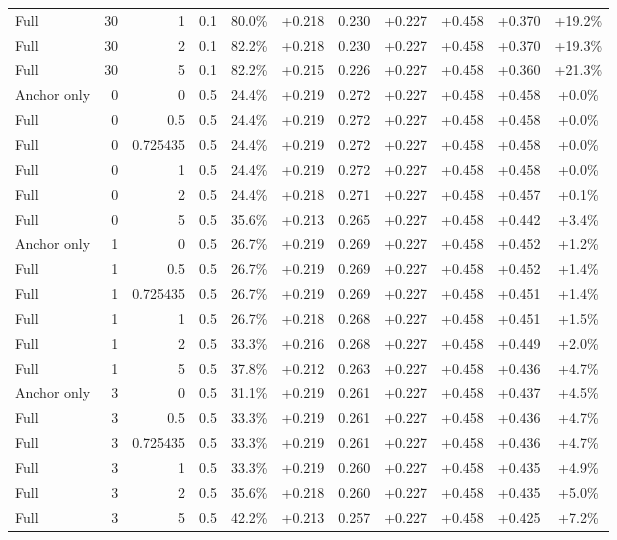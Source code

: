 \begin{table}[htbp]
\begin{tabular}{lrrrccccccc}
Full & 30 & 1 & 0.1 & 80.0\% & +0.218 & 0.230 & +0.227 & +0.458 & +0.370 & +19.2\% \\
Full & 30 & 2 & 0.1 & 82.2\% & +0.218 & 0.230 & +0.227 & +0.458 & +0.370 & +19.3\% \\
Full & 30 & 5 & 0.1 & 82.2\% & +0.215 & 0.226 & +0.227 & +0.458 & +0.360 & +21.3\% \\
Anchor only & 0 & 0 & 0.5 & 24.4\% & +0.219 & 0.272 & +0.227 & +0.458 & +0.458 & +0.0\% \\
Full & 0 & 0.5 & 0.5 & 24.4\% & +0.219 & 0.272 & +0.227 & +0.458 & +0.458 & +0.0\% \\
Full & 0 & 0.725435 & 0.5 & 24.4\% & +0.219 & 0.272 & +0.227 & +0.458 & +0.458 & +0.0\% \\
Full & 0 & 1 & 0.5 & 24.4\% & +0.219 & 0.272 & +0.227 & +0.458 & +0.458 & +0.0\% \\
Full & 0 & 2 & 0.5 & 24.4\% & +0.218 & 0.271 & +0.227 & +0.458 & +0.457 & +0.1\% \\
Full & 0 & 5 & 0.5 & 35.6\% & +0.213 & 0.265 & +0.227 & +0.458 & +0.442 & +3.4\% \\
Anchor only & 1 & 0 & 0.5 & 26.7\% & +0.219 & 0.269 & +0.227 & +0.458 & +0.452 & +1.2\% \\
Full & 1 & 0.5 & 0.5 & 26.7\% & +0.219 & 0.269 & +0.227 & +0.458 & +0.452 & +1.4\% \\
Full & 1 & 0.725435 & 0.5 & 26.7\% & +0.219 & 0.269 & +0.227 & +0.458 & +0.451 & +1.4\% \\
Full & 1 & 1 & 0.5 & 26.7\% & +0.218 & 0.268 & +0.227 & +0.458 & +0.451 & +1.5\% \\
Full & 1 & 2 & 0.5 & 33.3\% & +0.216 & 0.268 & +0.227 & +0.458 & +0.449 & +2.0\% \\
Full & 1 & 5 & 0.5 & 37.8\% & +0.212 & 0.263 & +0.227 & +0.458 & +0.436 & +4.7\% \\
Anchor only & 3 & 0 & 0.5 & 31.1\% & +0.219 & 0.261 & +0.227 & +0.458 & +0.437 & +4.5\% \\
Full & 3 & 0.5 & 0.5 & 33.3\% & +0.219 & 0.261 & +0.227 & +0.458 & +0.436 & +4.7\% \\
Full & 3 & 0.725435 & 0.5 & 33.3\% & +0.219 & 0.261 & +0.227 & +0.458 & +0.436 & +4.7\% \\
Full & 3 & 1 & 0.5 & 33.3\% & +0.219 & 0.260 & +0.227 & +0.458 & +0.435 & +4.9\% \\
Full & 3 & 2 & 0.5 & 35.6\% & +0.218 & 0.260 & +0.227 & +0.458 & +0.435 & +5.0\% \\
Full & 3 & 5 & 0.5 & 42.2\% & +0.213 & 0.257 & +0.227 & +0.458 & +0.425 & +7.2\% \\

\end{tabular}
\end{table}
